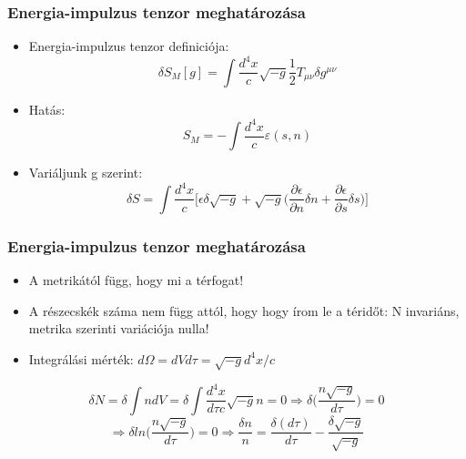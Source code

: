 \documentclass{beamer}
\begin{document}
\begin{frame}
\frametitle{Energia-impulzus tenzor meghatározása}
\begin{itemize}
  \setlength{\itemsep}{10pt}
    \item Energia-impulzus tenzor definiciója:
  \begin{equation}
  \delta S_M[g] = \int \frac{d^4x}{c}\sqrt{-g}\frac{1}{2}T_{\mu\nu}\delta g^{\mu\nu}
  \end{equation}
  \item Hatás:
    \begin{equation}
  	S_M = -\int\frac{d^4x}{c}\varepsilon(s, n)
  \end{equation}
	\item Variáljunk g szerint:
	\begin{equation}
	\delta S=\int \frac{d^4 x}{c}\bigg[\epsilon \delta \sqrt{-g}+\sqrt{-g}\bigg(\frac{\partial\epsilon}{\partial n}\delta n+\frac{\partial \epsilon}{\partial s}\delta s\bigg)\bigg]
	\end{equation}


 \end{itemize}
\end{frame}

\begin{frame}
\frametitle{Energia-impulzus tenzor meghatározása}
\begin{itemize}
  \setlength{\itemsep}{20pt}

\item A metrikától függ, hogy mi a térfogat!
\item A részecskék száma nem függ attól, hogy hogy írom le a téridőt: N invariáns, metrika szerinti variációja nulla!

\item Integrálási mérték: $d\Omega = dV d\tau = \sqrt{-g}d^4x/c$
\end{itemize}
\begin{equation*}
\delta N = \delta \int n dV= \delta \int \frac{d^4x}{d\tau c}\sqrt{-g}n=0\Rightarrow \delta\bigg(\frac{n\sqrt{-g}}{d\tau}\bigg)=0
\end{equation*}
\begin{equation*}
\Rightarrow  \delta ln\bigg(\frac{n\sqrt{-g}}{d\tau}\bigg)=0 \Rightarrow \frac{\delta n}{n}=\frac{\delta(d\tau)}{d\tau}-\frac{\delta\sqrt{-g}}{\sqrt{-g}}
\end{equation*}
\end{frame}
\end{document}
